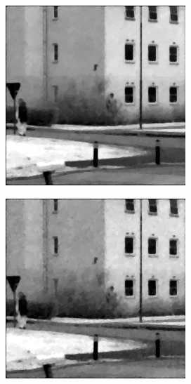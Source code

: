 \begin{figure}[H]
    \centering
\begin{minipage}[t]{0.32\textwidth}
    \includegraphics[width = \textwidth]{result/dynamic/lum/intense_change.png}
    \subcaption{}
    \label{fig:lum_22}
\end{minipage}
\begin{minipage}[t]{0.32\textwidth}
    \includegraphics[width = \textwidth]{result/dynamic/lum/intense_change_movemean_psnr_33_snr_29_sssim_93.png}

\end{minipage}
\end{figure}
